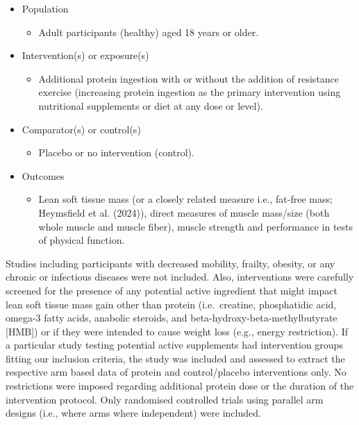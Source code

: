 \documentclass[
]{article}
\providecommand{\tightlist}{%
  \setlength{\itemsep}{0pt}\setlength{\parskip}{0pt}}
\begin{document}
\begin{itemize}
\tightlist
\item
  Population

  \begin{itemize}
  \tightlist
  \item
    Adult participants (healthy) aged 18 years or older.
  \end{itemize}
\item
  Intervention(s) or exposure(s)

  \begin{itemize}
  \tightlist
  \item
    Additional protein ingestion with or without the addition of
    resistance exercise (increasing protein ingestion as the primary
    intervention using nutritional supplements or diet at any dose or
    level).
  \end{itemize}
\item
  Comparator(s) or control(s)

  \begin{itemize}
  \tightlist
  \item
    Placebo or no intervention (control).
  \end{itemize}
\item
  Outcomes

  \begin{itemize}
  \tightlist
  \item
    Lean soft tissue mass (or a closely related measure i.e., fat-free
    mass; Heymsfield et al. (2024)), direct measures of muscle mass/size
    (both whole muscle and muscle fiber), muscle strength and
    performance in tests of physical function.
  \end{itemize}
\end{itemize}

Studies including participants with decreased mobility, frailty,
obesity, or any chronic or infectious diseases were not included. Also,
interventions were carefully screened for the presence of any potential
active ingredient that might impact lean soft tissue mass gain other
than protein (i.e.~creatine, phosphatidic acid, omega-3 fatty acids,
anabolic steroids, and beta-hydroxy-beta-methylbutyrate {[}HMB{]}) or if
they were intended to cause weight loss (e.g., energy restriction). If a
particular study testing potential active supplements had intervention
groups fitting our inclusion criteria, the study was included and
assessed to extract the respective arm based data of protein and
control/placebo interventions only. No restrictions were imposed
regarding additional protein dose or the duration of the intervention
protocol. Only randomised controlled trials using parallel arm designs
(i.e., where arms where independent) were included.
\end{document}
